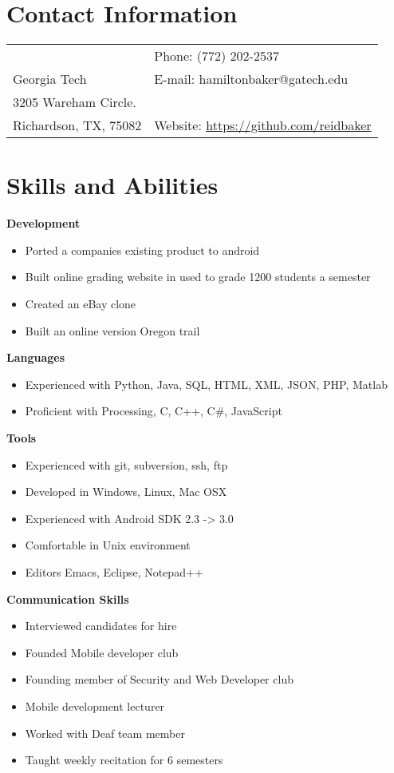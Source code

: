 \documentclass[margin,line]{res}
\begin{document}
 \hfill

\begin{resume}
\section{\sc Contact Information}
\vspace{.05in}
\begin{tabular}{@{}p{3.5in}p{3in}} & {Phone:}  (772) 202-2537 \\
Georgia Tech & {E-mail:}  hamiltonbaker@gatech.edu\\
3205 Wareham Circle. \\
Richardson, TX, 75082  & {Website:} \url{https://github.com/reidbaker}
\end{tabular}
 
\section{\sc Skills and Abilities}
 {\bf Development}
    \begin{itemize}
    \item Ported a companies existing product to android
    \item Built online grading website in used to grade 1200 students a
      semester
    \item Created an eBay clone
    \item Built an online version Oregon trail
    \end{itemize}
 {\bf Languages}
    \begin{itemize}
    \item Experienced with Python, Java, SQL, HTML, XML, JSON,
      PHP, Matlab
    \item Proficient with Processing, C, C++, C\#, JavaScript
    \end{itemize}
 {\bf Tools}
    \begin{itemize}
    \item Experienced with git, subversion, ssh, ftp
    \item Developed in Windows, Linux, Mac OSX
    \item Experienced with Android SDK 2.3 -> 3.0
    \item Comfortable in Unix environment
    \item Editors Emacs, Eclipse, Notepad++
    \end{itemize}
 {\bf Communication Skills}
    \begin{itemize}
    \item Interviewed candidates for hire
    \item Founded Mobile developer club
    \item Founding member of Security and Web Developer club
    \item Mobile development lecturer
    \item Worked with Deaf team member
    \item Taught weekly recitation for 6 semesters
    \end{itemize}

\end{resume}
\end{document}

